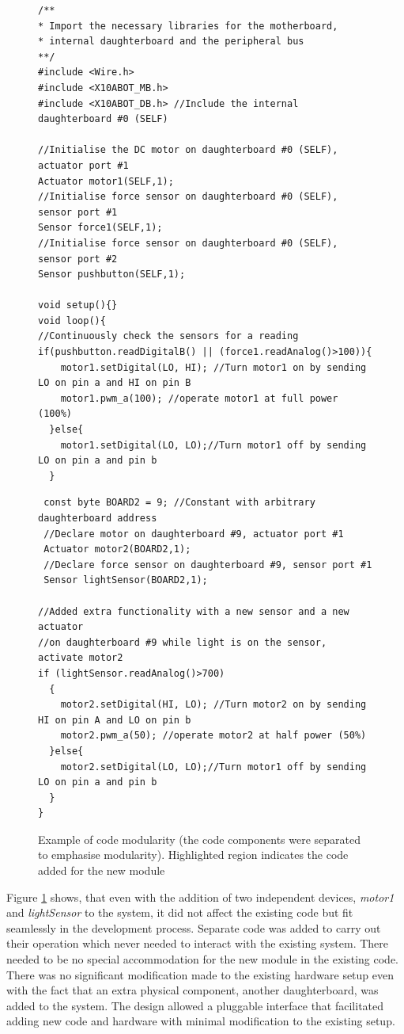 \begin{figure}
		\footnotesize
        {\fontsize{8}{6}\selectfont
		
		\begin{verbatim}
        \end{verbatim}
        \begin{verbatim}
/**
* Import the necessary libraries for the motherboard, 
* internal daughterboard and the peripheral bus
**/
#include <Wire.h>  
#include <X10ABOT_MB.h>
#include <X10ABOT_DB.h> //Include the internal daughterboard #0 (SELF)

//Initialise the DC motor on daughterboard #0 (SELF), actuator port #1
Actuator motor1(SELF,1);
//Initialise force sensor on daughterboard #0 (SELF), sensor port #1
Sensor force1(SELF,1);
//Initialise force sensor on daughterboard #0 (SELF), sensor port #2
Sensor pushbutton(SELF,1);
   
void setup(){}
void loop(){
//Continuously check the sensors for a reading
if(pushbutton.readDigitalB() || (force1.readAnalog()>100)){
    motor1.setDigital(LO, HI); //Turn motor1 on by sending LO on pin a and HI on pin B
    motor1.pwm_a(100); //operate motor1 at full power (100%) 
  }else{
    motor1.setDigital(LO, LO);//Turn motor1 off by sending LO on pin a and pin b
  }
 \end{verbatim}
 \begin{verbatim}
 const byte BOARD2 = 9; //Constant with arbitrary daughterboard address
 //Declare motor on daughterboard #9, actuator port #1
 Actuator motor2(BOARD2,1);
 //Declare force sensor on daughterboard #9, sensor port #1
 Sensor lightSensor(BOARD2,1);
 
//Added extra functionality with a new sensor and a new actuator
//on daughterboard #9 while light is on the sensor, activate motor2
if (lightSensor.readAnalog()>700)
  {
    motor2.setDigital(HI, LO); //Turn motor2 on by sending HI on pin A and LO on pin b
    motor2.pwm_a(50); //operate motor2 at half power (50%)
  }else{
    motor2.setDigital(LO, LO);//Turn motor1 off by sending LO on pin a and pin b
  }
}	 
	\end{verbatim}
		}
    \caption{Example of code modularity (the code components were separated to emphasise modularity). Highlighted region indicates the code added for the new module} \label{code:modularity}
\end{figure}
Figure \ref{code:modularity} shows, that even with the addition of two independent devices, \emph{motor1} and \emph{lightSensor} to the system, it did not affect the existing code but fit seamlessly in the development process. Separate code was added to carry out their operation which never needed to interact with the existing system. There needed to be no special accommodation for the new module in the existing code. There was no significant modification made to the existing hardware setup even with the fact that an extra physical component, another daughterboard, was added to the system. The \xten design allowed a pluggable interface that facilitated adding new code and hardware with minimal modification to the existing setup.
